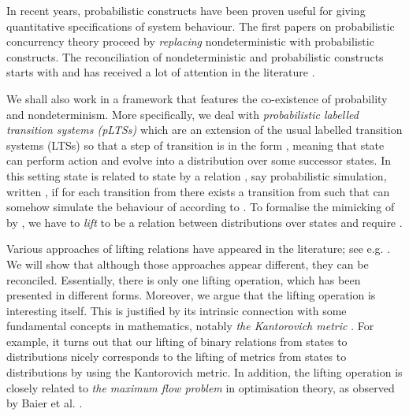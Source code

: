 \documentclass{article}
\begin{document}
In recent years, probabilistic constructs have been proven useful
for giving quantitative specifications of system behaviour. The
first papers on probabilistic concurrency theory
\cite{GJS90,Chr90,larsenskou} proceed by \emph{replacing}
nondeterministic with probabilistic constructs. The reconciliation
of nondeterministic and probabilistic constructs starts with
\cite{HJ90} and has received a lot of attention in the literature
\cite{WL92,SL94,Lowe95,Seg95,HK97,MM97,BS01,JW02,mislove03,CIN05,TKP05,MM07,
DGHMZ07,DGMZ07,DGHM08,DGHM09}.

We shall also work in a framework that features the co-existence of
probability and nondeterminism. More specifically, we deal with
\emph{probabilistic labelled transition systems (pLTSs)}
\cite{DGHMZ07} which are an extension of the usual labelled
transition systems (LTSs) so that a step of transition is in the
form , meaning that state  can perform action 
and evolve into a distribution  over some successor states.
In this setting state  is related to state  by a relation
, say probabilistic simulation, written , if for
each transition  from  there exists a transition
 from  such that  can somehow simulate the
behaviour of  according to . To formalise the
mimicking of  by , we have to \emph{lift}  to
be a relation  between distributions over states and
require .

Various approaches of lifting relations have appeared in the
literature; see e.g. \cite{LS91,SL94,DGHMZ07,DD07,DGHM09}. We will
show that although those approaches appear different, they can be
reconciled. Essentially, there is only one lifting operation, which
has been presented in different forms. Moreover, we argue that the
lifting operation is interesting itself. This is justified by its
intrinsic connection with some fundamental concepts in mathematics,
notably \emph{the Kantorovich metric} \cite{Kan42}. For example, it
turns out that our lifting of binary relations from states to
distributions nicely corresponds to the lifting of metrics from
states to distributions by using the Kantorovich metric. In
addition, the lifting operation is closely related to \emph{the
maximum flow problem} in optimisation theory, as observed by Baier
et al. \cite{BEM00}.
\end{document}
